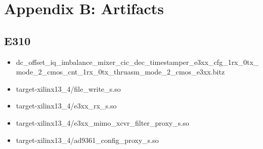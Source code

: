 \section{Appendix B: Artifacts}
\subsection{E310}
	\begin{itemize}
	\item dc\_offset\_iq\_imbalance\_mixer\_cic\_dec\_timestamper\_e3xx\_cfg\_1rx\_0tx\_mode\_2\_cmos\_cnt\_1rx\_0tx\_thruasm\_mode\_2\_cmos\_e3xx.bitz
	\item target-xilinx13\_4/file\_write\_s.so
	\item target-xilinx13\_4/e3xx\_rx\_s.so
	\item target-xilinx13\_4/e3xx\_mimo\_xcvr\_filter\_proxy\_s.so
	\item target-xilinx13\_4/ad9361\_config\_proxy\_s.so
	\end{itemize}

